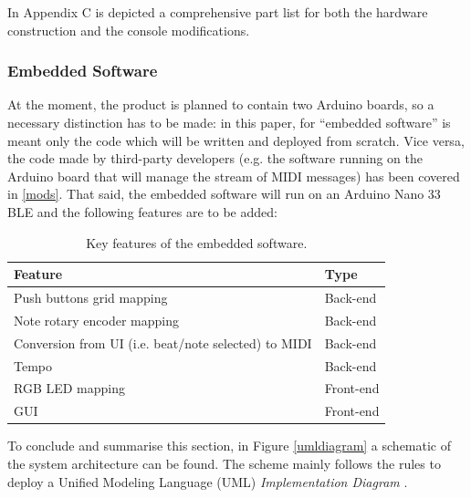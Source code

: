 \documentclass[]{article}
\begin{document}
        In Appendix C is depicted a comprehensive part list for both the hardware construction and the console modifications.      %

        \subsubsection{Embedded Software}\label{software}
        At the moment, the product is planned to contain two Arduino boards, so a necessary distinction has to be made: in this paper, for ``embedded software'' is meant only the code 
        which will be written and deployed from scratch. Vice versa, the code made by third-party developers (e.g. the software running on the Arduino board that will manage 
        the stream of MIDI messages) has been covered in \ref{mods}. That said, the embedded software will run on an Arduino Nano 33 BLE and the following features are to be added:\\

        \begin{table}[h!]
            \centering
            \begin{tabular}{|l|l|}
                \hline
                \textbf{Feature} & \textbf{Type}\\
                \hline
                Push buttons grid mapping & Back-end\\
                \hline
                Note rotary encoder mapping & Back-end\\
                \hline
                Conversion from UI (i.e. beat/note selected) to MIDI & Back-end\\
                \hline
                Tempo & Back-end\\
                \hline
                RGB LED mapping & Front-end\\
                \hline
                GUI & Front-end\\
                \hline
            \end{tabular}
            \caption{Key features of the embedded software.}
        \end{table}

        To conclude and summarise this section, in Figure \ref{umldiagram} a schematic of the system architecture can be found.
        The scheme mainly follows the rules to deploy a Unified Modeling Language (UML) \emph{Implementation Diagram} \cite{STEVENS2006}.
\end{document}
